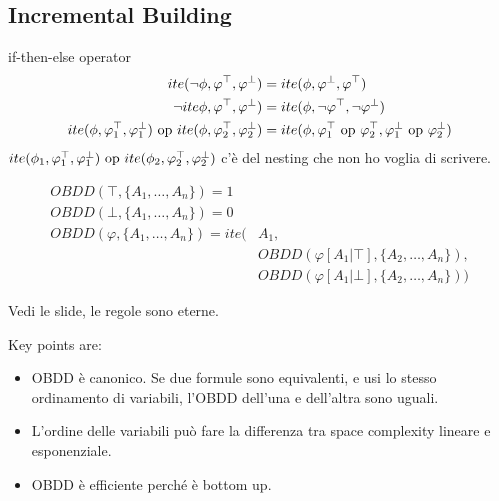 \documentclass{article}
\begin{document}
\subsection{Incremental Building}
\begin{callout}[blue]{if-then-else operator}
    \begin{align*}
        ite(\neg\phi,\varphi^\top,\varphi^\bot) &= ite(\phi,\varphi^\bot,\varphi^\top) \\
        \neg ite\phi,\varphi^\top,\varphi^\bot) &= ite(\phi,\neg\varphi^\top,\neg\varphi^\bot) \\
        ite(\phi,\varphi_1^\top,\varphi_1^\bot) \text{ op } ite(\phi,\varphi_2^\top,\varphi_2^\bot)
                                                &= ite(\phi,\varphi_1^\top\text{ op }\varphi_2^\top,\varphi_1^\bot\text{ op }\varphi_2^\bot) \\
    \end{align*}
    $ite(\phi_1,\varphi_1^\top,\varphi_1^\bot) \text{ op } ite(\phi_2,\varphi_2^\top,\varphi_2^\bot)$ c'è del nesting che non ho voglia di scrivere.
\end{callout}

\begin{align*}
    OBDD(\top,\{A_1,\dots,A_n\}) = 1 & \\
    OBDD(\bot,\{A_1,\dots,A_n\}) = 0 & \\
    OBDD(\varphi,\{A_1,\dots,A_n\}) = ite(& A_1, \\
                                     & OBDD(\varphi[A_1|\top], \{A_2,\dots,A_n\}), \\
                                     & OBDD(\varphi[A_1|\bot],\{A_2,\dots,A_n\}))
\end{align*}

Vedi le slide, le regole sono eterne.

Key points are:
\begin{itemize}
    \item OBDD è canonico. Se due formule sono equivalenti, e usi lo stesso ordinamento di variabili, l'OBDD dell'una e dell'altra sono uguali.
    \item L'ordine delle variabili può fare la differenza tra space complexity lineare e esponenziale.
    \item OBDD è efficiente perché è bottom up.
\end{itemize}
\end{document}
